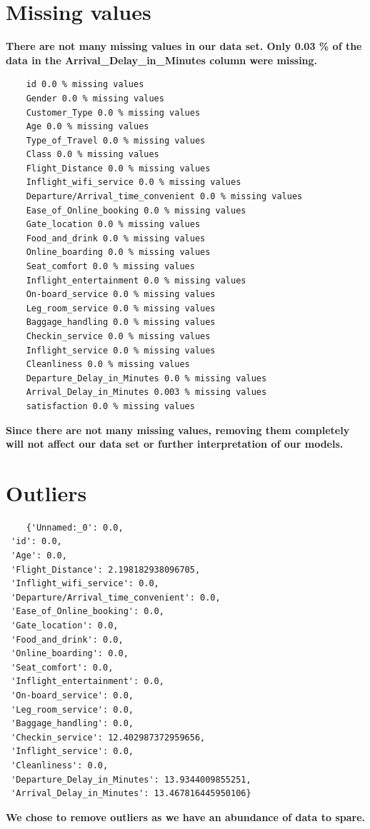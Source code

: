 \documentclass[11pt]{article}
\begin{document}
    
\section{Missing values}
\textbf{There are not many missing values in our data set. Only 0.03 \% of the data in the Arrival\_Delay\_in\_Minutes column were missing.}
\begin{verbatim}
    id 0.0 % missing values
    Gender 0.0 % missing values
    Customer_Type 0.0 % missing values
    Age 0.0 % missing values
    Type_of_Travel 0.0 % missing values
    Class 0.0 % missing values
    Flight_Distance 0.0 % missing values
    Inflight_wifi_service 0.0 % missing values
    Departure/Arrival_time_convenient 0.0 % missing values
    Ease_of_Online_booking 0.0 % missing values
    Gate_location 0.0 % missing values
    Food_and_drink 0.0 % missing values
    Online_boarding 0.0 % missing values
    Seat_comfort 0.0 % missing values
    Inflight_entertainment 0.0 % missing values
    On-board_service 0.0 % missing values
    Leg_room_service 0.0 % missing values
    Baggage_handling 0.0 % missing values
    Checkin_service 0.0 % missing values
    Inflight_service 0.0 % missing values
    Cleanliness 0.0 % missing values
    Departure_Delay_in_Minutes 0.0 % missing values
    Arrival_Delay_in_Minutes 0.003 % missing values
    satisfaction 0.0 % missing values
\end{verbatim}
\textbf{Since there are not many missing values, removing them completely will not affect our data set or further interpretation of our models.}


\section{Outliers}
\begin{verbatim}
    {'Unnamed:_0': 0.0,
 'id': 0.0,
 'Age': 0.0,
 'Flight_Distance': 2.198182938096705,
 'Inflight_wifi_service': 0.0,
 'Departure/Arrival_time_convenient': 0.0,
 'Ease_of_Online_booking': 0.0,
 'Gate_location': 0.0,
 'Food_and_drink': 0.0,
 'Online_boarding': 0.0,
 'Seat_comfort': 0.0,
 'Inflight_entertainment': 0.0,
 'On-board_service': 0.0,
 'Leg_room_service': 0.0,
 'Baggage_handling': 0.0,
 'Checkin_service': 12.402987372959656,
 'Inflight_service': 0.0,
 'Cleanliness': 0.0,
 'Departure_Delay_in_Minutes': 13.9344009855251,
 'Arrival_Delay_in_Minutes': 13.467816445950106}
\end{verbatim}
\textbf{We chose to remove outliers as we have an abundance of data to spare.}
\end{document}
